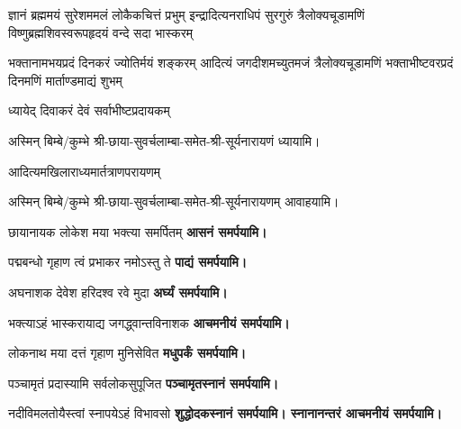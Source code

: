 \begin{center}

{ज्ञानं ब्रह्ममयं सुरेशममलं लोकैकचित्तं प्रभुम्}
{इन्द्रादित्यनराधिपं सुरगुरुं त्रैलोक्यचूडामणिं}
{विष्णुब्रह्मशिवस्वरूपहृदयं वन्दे सदा भास्करम्}

{भक्तानामभयप्रदं दिनकरं ज्योतिर्मयं शङ्करम्}
{आदित्यं जगदीशमच्युतमजं त्रैलोक्यचूडामणिं}
{भक्ताभीष्टवरप्रदं दिनमणिं मार्ताण्डमाद्यं शुभम्}

{ध्यायेद् दिवाकरं देवं सर्वाभीष्टप्रदायकम्} 

अस्मिन् बिम्बे/कुम्भे श्री-छाया-सुवर्चलाम्बा-समेत-श्री-सूर्यनारायणं ध्यायामि। 


{आदित्यमखिलाराध्यमार्तत्राणपरायणम्}


अस्मिन् बिम्बे/कुम्भे श्री-छाया-सुवर्चलाम्बा-समेत-श्री-सूर्यनारायणम् आवाहयामि।

\aavaahitobhava

{छायानायक लोकेश मया भक्त्या समर्पितम्}
\textbf{\devAya{} आसनं समर्पयामि।}

{पद्मबन्धो गृहाण त्वं प्रभाकर नमोऽस्तु ते}
\textbf{\devAya{} पाद्यं समर्पयामि।}

{अघनाशक देवेश हरिदश्व रवे मुदा}
\textbf{\devAya{} अर्घ्यं समर्पयामि।}

{भक्त्याऽहं भास्करायाद्य जगद्ध्वान्तविनाशक}
\textbf{\devAya{} आचमनीयं समर्पयामि।}

{लोकनाथ मया दत्तं गृहाण मुनिसेवित}
\textbf{\devAya{} मधुपर्कं समर्पयामि।}

{पञ्चामृतं प्रदास्यामि सर्वलोकसुपूजित}
\textbf{\devAya{} पञ्चामृतस्नानं समर्पयामि।}

{नदीविमलतोयैस्त्वां स्नापयेऽहं विभावसो}
\textbf{\devAya{} शुद्धोदकस्नानं समर्पयामि। स्नानानन्तरं आचमनीयं समर्पयामि।}


\end{center}
